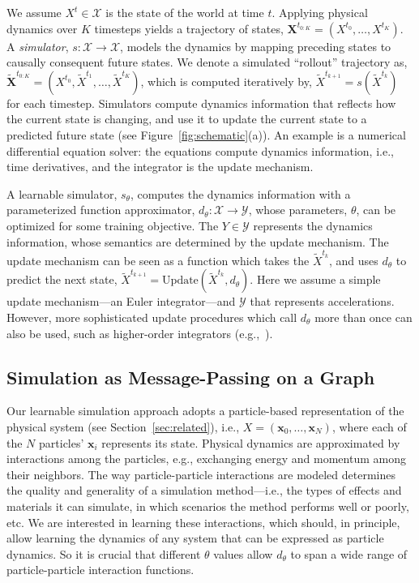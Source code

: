 \documentclass{article}
\newcommand{\simulator}{s}
\newcommand{\dynamics}{d}
\begin{document}
We assume $X^t \in \mathcal{X}$ is the state of the world at time $t$. Applying  physical dynamics over $K$ timesteps yields a trajectory of states, $\mathbf{X}^{t_{0:K}} = (X^{t_0}, \dots, X^{t_K})$.
%
A \textit{simulator}, ${\simulator: \mathcal{X} \rightarrow \mathcal{X}}$, models the dynamics by mapping preceding states to causally consequent future states. We denote a simulated ``rollout'' trajectory as, ${\tilde{\mathbf{X}}^{t_{0:K}} = (X^{t_0}, \tilde{X}^{t_1}, \dots, \tilde{X}^{t_K})}$, which is computed iteratively by, ${\tilde{X}^{t_{k+1}} = \simulator(\tilde{X}^{t_{k}})}$
%
for each timestep.
%
%
%
Simulators compute dynamics information that reflects how the current state is changing, and use it to update the current state to a predicted future state (see Figure~\ref{fig:schematic}(a)). An example is a numerical differential equation solver: the equations compute dynamics information, i.e., time derivatives, and the integrator is the update mechanism.

A learnable simulator, $\simulator_\theta$, computes the dynamics information with a parameterized function approximator, ${\dynamics_\theta: \mathcal{X} \rightarrow \mathcal{Y}}$, whose parameters, $\theta$, can be optimized for some training objective. The ${Y \in \mathcal{Y}}$ represents the dynamics information, whose semantics are determined by the update mechanism. The update mechanism can be seen as a function which takes the $\tilde{X}^{t_{k}}$, and uses $d_\theta$ to predict the next state, $\tilde{X}^{t_{k+1}} = \textrm{Update}(\tilde{X}^{t_{k}}, \dynamics_\theta)$. Here we assume a simple update mechanism---an Euler integrator---and $\mathcal{Y}$ that represents accelerations. However, more sophisticated update procedures which call $\dynamics_\theta$ more than once can also be used, such as higher-order integrators (e.g.,~\citet{sanchez2019hamiltonian}). 
%
%
%
%
%


\subsection{Simulation as Message-Passing on a Graph}
\label{sec:model:message-passing}

Our learnable simulation approach adopts a particle-based representation of the physical system (see Section~\ref{sec:related}), i.e., $X = (\mathbf{x}_0, \dots, \mathbf{x}_N)$, where each of the $N$ particles' $\mathbf{x}_i$ represents its state. Physical dynamics are approximated by interactions among the particles, e.g., exchanging energy and momentum among their neighbors. The way particle-particle interactions are modeled determines the quality and generality of a simulation method---i.e., the types of effects and materials it can simulate, in which scenarios the method performs well or poorly, etc. We are interested in learning these interactions, which should, in principle, allow learning the dynamics of any system that can be expressed as particle dynamics. So it is crucial that different $\theta$ values allow $d_\theta$ to span a wide range of particle-particle interaction functions.
\end{document}
